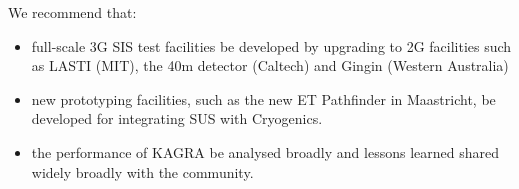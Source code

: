 We recommend that:
\begin{itemize}
\item full-scale 3G SIS  test facilities be developed by upgrading to 2G facilities such as LASTI (MIT), the 40m detector (Caltech) and Gingin (Western Australia) 
\item new prototyping facilities, such as the new ET Pathfinder in Maastricht,  be developed  for integrating SUS with Cryogenics.
\item the performance  of KAGRA be analysed broadly and lessons learned shared widely broadly with the community.
\end{itemize}











